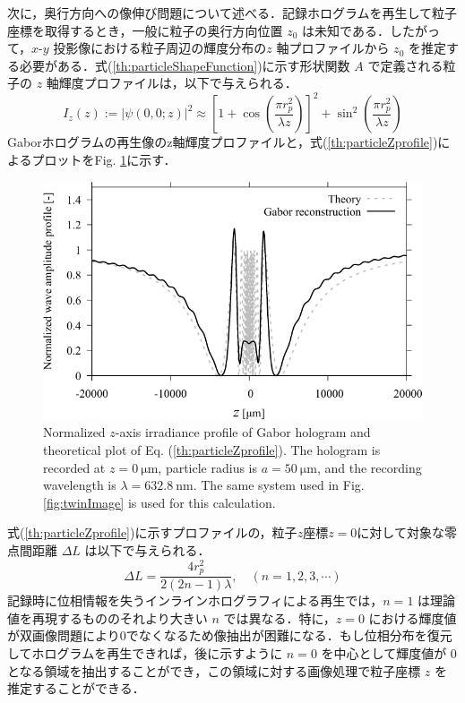次に，奥行方向への像伸び問題について述べる．記録ホログラムを再生して粒子座標を取得するとき，一般に粒子の奥行方向位置 $z_0$ は未知である．したがって，$x$-$y$ 投影像における粒子周辺の輝度分布の$z$ 軸プロファイルから $z_0$ を推定する必要がある．式(\ref{th:particleShapeFunction})に示す形状関数 $A$ で定義される粒子の $z$ 軸輝度プロファイルは，以下で与えられる\cite{born1970,tanaka2024}．
\begin{equation}
    \label{th:particleZprofile}
    I_z(z) := \left| \psi(0,0;z) \right|^2 \approx \left[ 1 + \cos{\left( \frac{\pi r_p^2}{\lambda z} \right)} \right]^2 + \sin^2{\left( \frac{\pi r_p^2}{\lambda z} \right)}
\end{equation}
Gaborホログラムの再生像のz軸輝度プロファイルと，式(\ref{th:particleZprofile})によるプロットをFig. \ref{fig:particleZprofile}に示す．
\begin{figure}[htbp]
    \centering
    \includegraphics[width=0.8\linewidth]{./Figure/2_Theory/zprofile.pdf}
    \caption{Normalized $z$-axis irradiance profile of Gabor hologram and theoretical plot of Eq. (\ref{th:particleZprofile}). The hologram is recorded at $z = \SI{0}{\um}$, particle radius is $a=\SI{50}{\um}$, and the recording wavelength is $\lambda = \SI{632.8}{\nm}$. The same system used in Fig. \ref{fig:twinImage} is used for this calculation.}
    \label{fig:particleZprofile}
\end{figure}
式(\ref{th:particleZprofile})に示すプロファイルの，粒子$z$座標$z=0$に対して対象な零点間距離 $\Delta L$ は以下で与えられる\cite{nakatani2019}．
\begin{equation}
    \label{th:elongationLength}
    \Delta L = \frac{4r_p^2}{2(2n-1)\lambda}, \quad (n=1,2,3,\cdots)
\end{equation}
記録時に位相情報を失うインラインホログラフィによる再生では，$n=1$ は理論値を再現するもののそれより大きい $n$ では異なる．特に，$z=0$ における輝度値が双画像問題により0でなくなるため像抽出が困難になる．もし位相分布を復元してホログラムを再生できれば，後に示すように $n=0$ を中心として輝度値が 0 となる領域を抽出することができ，この領域に対する画像処理で粒子座標 $z$ を推定することができる．


